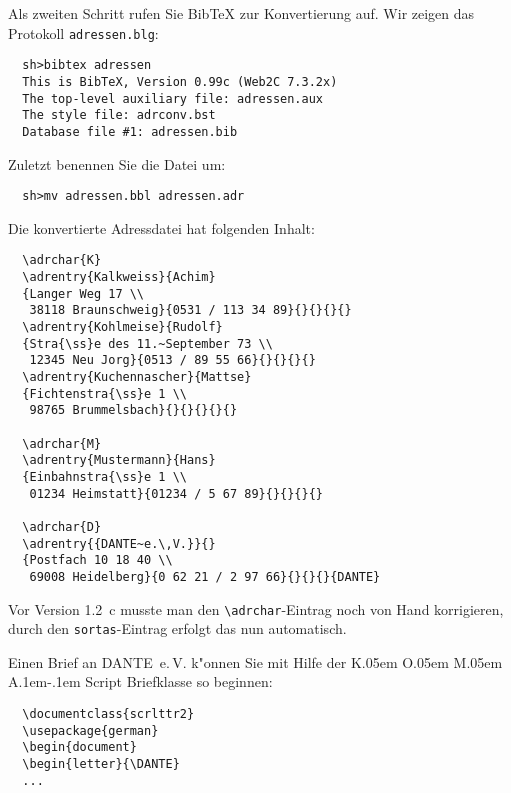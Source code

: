 \documentclass{article}
\newcommand*{\File}[1]{\texttt{#1}}
\newcommand*{\Macro}[1]{\texttt{\textbackslash #1}}
\DeclareRobustCommand{\KOMAScript}{\textsf{K\kern.05em O\kern.05em%
      M\kern.05em A\kern.1em-\kern.1em Script}}
\begin{document}
Als zweiten Schritt rufen Sie Bib\TeX{} zur 
Konvertierung auf. Wir 
zeigen das Protokoll \File{adressen.blg}: 

\begin{small}
\begin{verbatim}
  sh>bibtex adressen
  This is BibTeX, Version 0.99c (Web2C 7.3.2x)
  The top-level auxiliary file: adressen.aux
  The style file: adrconv.bst
  Database file #1: adressen.bib
\end{verbatim}
\end{small}

Zuletzt benennen Sie die Datei um:

\begin{small}
\begin{verbatim}
  sh>mv adressen.bbl adressen.adr
\end{verbatim}
\end{small}

Die konvertierte Adressdatei hat folgenden Inhalt:

\begin{small}
\begin{verbatim}
  \adrchar{K}
  \adrentry{Kalkweiss}{Achim}
  {Langer Weg 17 \\ 
   38118 Braunschweig}{0531 / 113 34 89}{}{}{}{}
  \adrentry{Kohlmeise}{Rudolf}
  {Stra{\ss}e des 11.~September 73 \\ 
   12345 Neu Jorg}{0513 / 89 55 66}{}{}{}{}
  \adrentry{Kuchennascher}{Mattse}
  {Fichtenstra{\ss}e 1 \\ 
   98765 Brummelsbach}{}{}{}{}{}

  \adrchar{M}
  \adrentry{Mustermann}{Hans}
  {Einbahnstra{\ss}e 1 \\ 
   01234 Heimstatt}{01234 / 5 67 89}{}{}{}{}

  \adrchar{D}
  \adrentry{{DANTE~e.\,V.}}{}
  {Postfach 10 18 40 \\ 
   69008 Heidelberg}{0 62 21 / 2 97 66}{}{}{}{DANTE}
\end{verbatim}
\end{small}

Vor Version 1.2~c musste man den \Macro{adrchar}-Eintrag noch von Hand korrigieren, durch den \texttt{sortas}-Eintrag erfolgt das nun automatisch.

Einen Brief an DANTE~e.\,V. k"onnen Sie  
mit Hilfe der \KOMAScript{} Briefklasse so beginnen:

\begin{small}
\begin{verbatim}
  \documentclass{scrlttr2}
  \usepackage{german}
  \begin{document}
  \begin{letter}{\DANTE}
  ...
\end{verbatim}
\end{small}
\end{document}
